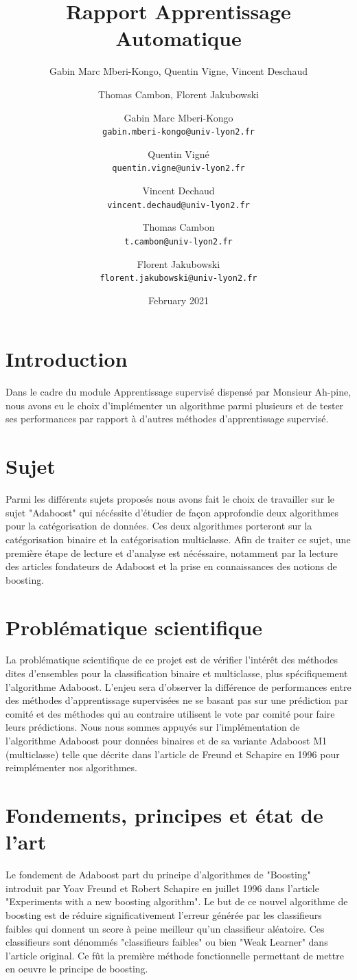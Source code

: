 \documentclass{article}
\title{Rapport Apprentissage Automatique}
\author{Gabin Marc Mberi-Kongo, Quentin Vigne, Vincent Deschaud}
\author{Thomas Cambon, Florent Jakubowski }
\author{
  Gabin Marc Mberi-Kongo\\
  \texttt{gabin.mberi-kongo@univ-lyon2.fr}
  \and
  Quentin Vigné\\
  \texttt{quentin.vigne@univ-lyon2.fr}
  \and
  Vincent Dechaud\\
  \texttt{vincent.dechaud@univ-lyon2.fr}
  \and
  Thomas Cambon\\
  \texttt{t.cambon@univ-lyon2.fr}
  \and
  Florent Jakubowski\\
  \texttt{florent.jakubowski@univ-lyon2.fr}
}
\date{February 2021}
\begin{document}
\maketitle

\tableofcontents

\section{Introduction}

Dans le cadre du module Apprentissage supervisé dispensé par Monsieur Ah-pine, nous avons eu le choix d'implémenter un algorithme parmi plusieurs et de tester ses performances par rapport à d'autres méthodes d'apprentissage supervisé. 

\section{Sujet}
Parmi les différents sujets proposés nous avons fait le choix de travailler sur le sujet "Adaboost" qui nécéssite d'étudier de façon approfondie deux algorithmes pour la catégorisation de données. Ces deux algorithmes porteront sur la catégorisation binaire et la catégorisation multiclasse. Afin de traiter ce sujet, une première étape de lecture et d'analyse est nécéssaire, notamment par la lecture des articles fondateurs de Adaboost et la prise en connaissances des notions de boosting.  
\section{Problématique scientifique}
La problématique scientifique de ce projet est de vérifier l'intérêt des méthodes dites d'ensembles pour la classification binaire et multiclasse, plus spécifiquement l'algorithme Adaboost. L'enjeu sera d'observer la différence de performances entre des méthodes d'apprentissage supervisées ne se basant pas sur une prédiction par comité et des méthodes qui au contraire utilisent le vote par comité pour faire leurs prédictions.
Nous nous sommes appuyés sur l'implémentation de l'algorithme Adaboost pour données binaires et de sa variante Adaboost M1 (multiclasse) telle que décrite dans l'article de Freund et Schapire \citep{FreundSchapire1996} en 1996 pour reimplémenter nos algorithmes.

\section{Fondements, principes et état de l'art}
Le fondement de Adaboost part du principe d'algorithmes de "Boosting" introduit par Yoav Freund et Robert Schapire en juillet 1996 \citep{FreundSchapire1996} dans l'article "Experiments with a new boosting algorithm". Le but de ce nouvel algorithme de boosting est de réduire significativement l'erreur générée par les classifieurs faibles qui donnent un score à peine meilleur qu'un classifieur aléatoire. Ces classifieurs sont dénommés "classifieurs faibles" ou bien "Weak Learner" dans l'article original. Ce fût la première méthode fonctionnelle permettant de mettre en oeuvre le principe de boosting.
\end{document}
